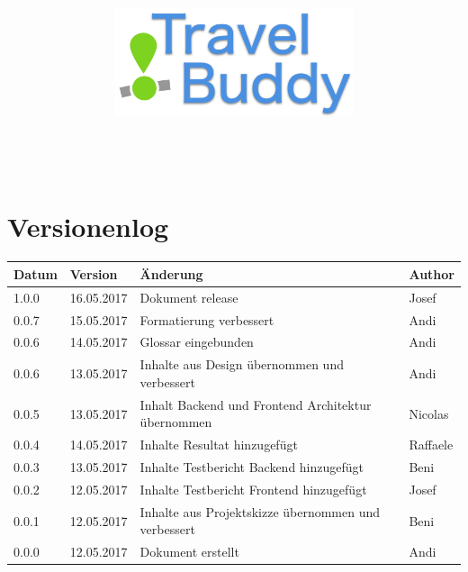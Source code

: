 \documentclass[a4paper,10pt,xetex]{article}
\title{
  \includegraphics[width=7cm]{travel-buddy_white}\\[\bigskipamount]
  \documenttitle\\[\bigskipamount]
}
\author{\documentauthors}
\date{\parbox{\linewidth}{\centering%
  IT15TA ZH \hspace*{3cm} Gruppe 3\endgraf\bigskip
  Dokumentversion \documentversion, \documentdate\endgraf
}}
\begin{document}

\maketitle\newpage

{
\hypersetup{linkcolor=black}
\setcounter{tocdepth}{4}
\tableofcontents
}

\newpage

\section{Versionenlog}\label{versionenlog}

\tabulinesep=1.2mm

\begin{longtabu} to \textwidth { | l | l | X[l] | l | }
  \hline
  \textbf{Datum} & \textbf{Version} & \textbf{Änderung} & \textbf{Author} \\
  \hline
  \endhead

  1.0.0 & 16.05.2017 & Dokument release & Josef\\
  \hline

  0.0.7 & 15.05.2017 & Formatierung verbessert & Andi\\
  \hline

  0.0.6 & 14.05.2017 & Glossar eingebunden & Andi\\
  \hline

  0.0.6 & 13.05.2017 & Inhalte aus Design übernommen und verbessert & Andi\\
  \hline

  0.0.5 & 13.05.2017 & Inhalt Backend und Frontend Architektur übernommen & Nicolas\\
  \hline

  0.0.4 & 14.05.2017 & Inhalte Resultat hinzugefügt & Raffaele\\
  \hline

  0.0.3 & 13.05.2017 & Inhalte Testbericht Backend hinzugefügt & Beni\\
  \hline

  0.0.2 & 12.05.2017 & Inhalte Testbericht Frontend hinzugefügt & Josef\\
  \hline

  0.0.1 & 12.05.2017 & Inhalte aus Projektskizze übernommen und verbessert & Beni\\
  \hline

  0.0.0 & 12.05.2017 & Dokument erstellt & Andi\\
  \hline
\end{longtabu}
\newpage
\end{document}
